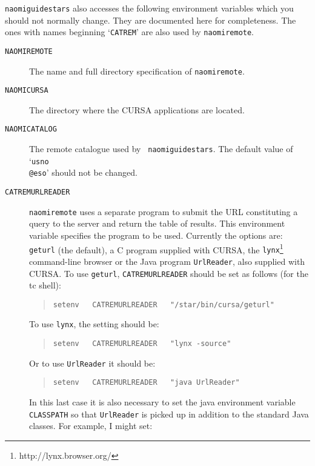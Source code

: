 \documentclass[twoside,11pt]{article}
\newcommand{\htmladdnormallinkfoot}[2]{#1\footnote{#2}}
\renewcommand{\_}{\texttt{\symbol{95}}}
\begin{document}
{\tt naomiguidestars} also accesses the following environment variables
which you should not normally change.  They are documented here for
completeness.  The ones with names beginning `{\tt CATREM\_}' are also
used by {\tt naomiremote}.

\begin{description}

  \item[{\tt NAOMI\_REMOTE}] The name and full directory specification
   of {\tt naomiremote}.

  \item[{\tt NAOMI\_CURSA}] The directory where the CURSA applications
   are located.

  \item[{\tt NAOMI\_CATALOG}] The remote catalogue used by {\tt
   naomiguidestars}.  The default value of `{\tt usno\\@eso}' should
   not be changed.

  \item[{\tt CATREM\_URLREADER}] {\tt naomiremote} uses a separate program
   to submit the URL constituting a query to the server and return the
   table of results.  This environment variable specifies the program to
   be used.  Currently the options are: {\tt geturl} (the default), a C
   program supplied with CURSA, the
   \htmladdnormallinkfoot{{\tt lynx}}{http://lynx.browser.org/}
   command-line browser or the Java program {\tt UrlReader}, also supplied
   with CURSA.  To use {\tt geturl}, {\tt CATREM\_URLREADER} should be set
   as follows (for the tc shell):

  \begin{quote}
   {\tt setenv ~ CATREM\_URLREADER ~ "/star/bin/cursa/geturl"}
  \end{quote}

   To use {\tt lynx}, the setting should be:

  \begin{quote}
   {\tt setenv ~ CATREM\_URLREADER ~ "lynx -source"}
  \end{quote}

   Or to use {\tt UrlReader} it should be:

  \begin{quote}
   {\tt setenv ~ CATREM\_URLREADER ~ "java  UrlReader"}
  \end{quote}

   In this last case it is also necessary to set the java environment variable
   {\tt CLASSPATH} so that {\tt UrlReader} is picked up in addition to the
   standard Java classes.  For example, I might set:


\end{description}
\end{document}
